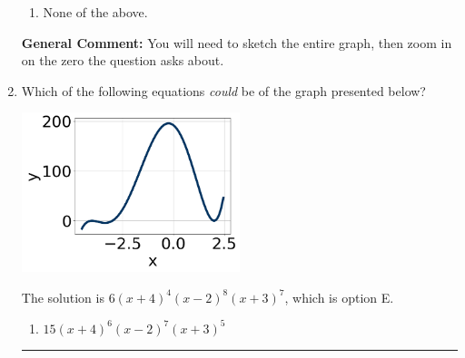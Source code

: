 \documentclass{extbook}[14pt]
\newcommand{\litem}[1]{\item #1

\rule{\textwidth}{0.4pt}}
\begin{document}
\begin{enumerate}
{\begin{enumerate}[label=\Alph*.]
\item None of the above.\end{enumerate}
\textbf{General Comment:} You will need to sketch the entire graph, then zoom in on the zero the question asks about.
}
\litem{
Which of the following equations \textit{could} be of the graph presented below?

\begin{center}
    \includegraphics[width=0.5\textwidth]{../Figures/polyGraphToFunctionC.png}
\end{center}


The solution is \( 6(x + 4)^{4} (x - 2)^{8} (x + 3)^{7} \), which is option E.\begin{enumerate}[label=\Alph*.]
\item \( 15(x + 4)^{6} (x - 2)^{7} (x + 3)^{5} \)


\end{enumerate}}
\end{enumerate}
\end{document}
